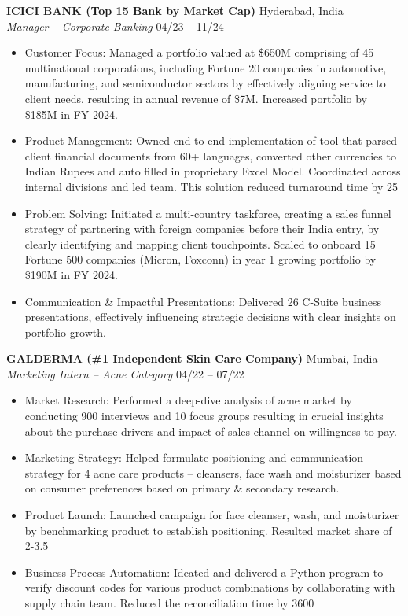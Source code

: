 \documentclass[10pt,letterpaper]{article}
\begin{document}
\noindent\textbf{ICICI BANK (Top 15 Bank by Market Cap)} \hfill Hyderabad, India\\
\textit{Manager -- Corporate Banking} \hfill 04/23 -- 11/24
\begin{itemize}
  \item Customer Focus: Managed a portfolio valued at \$650M comprising of 45 multinational corporations, including Fortune 20 companies in automotive, manufacturing, and semiconductor sectors by effectively aligning service to client needs, resulting in annual revenue of \$7M. Increased portfolio by \$185M in FY 2024.
  \item Product Management: Owned end-to-end implementation of tool that parsed client financial documents from 60+ languages, converted other currencies to Indian Rupees and auto filled in proprietary Excel Model. Coordinated across internal divisions and led team. This solution reduced turnaround time by 25%
  \item Problem Solving: Initiated a multi-country taskforce, creating a sales funnel strategy of partnering with foreign companies before their India entry, by clearly identifying and mapping client touchpoints. Scaled to onboard 15 Fortune 500 companies (Micron, Foxconn) in year 1 growing portfolio by \$190M in FY 2024.
  \item Communication \& Impactful Presentations: Delivered 26 C-Suite business presentations, effectively influencing strategic decisions with clear insights on portfolio growth.
\end{itemize}

\noindent\textbf{GALDERMA (\#1 Independent Skin Care Company)} \hfill Mumbai, India\\
\textit{Marketing Intern -- Acne Category} \hfill 04/22 -- 07/22
\begin{itemize}
  \item Market Research: Performed a deep-dive analysis of acne market by conducting 900 interviews and 10 focus groups resulting in crucial insights about the purchase drivers and impact of sales channel on willingness to pay.
  \item Marketing Strategy: Helped formulate positioning and communication strategy for 4 acne care products -- cleansers, face wash and moisturizer based on consumer preferences based on primary \& secondary research.
  \item Product Launch: Launched campaign for face cleanser, wash, and moisturizer by benchmarking product to establish positioning. Resulted market share of 2-3.5%
  \item Business Process Automation: Ideated and delivered a Python program to verify discount codes for various product combinations by collaborating with supply chain team. Reduced the reconciliation time by 3600%
\end{itemize}
\end{document}
